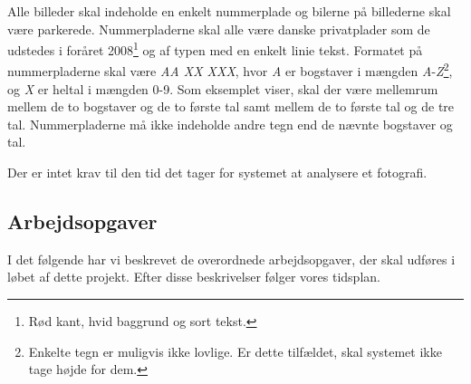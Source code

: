 \documentclass[12pt,a4paper,final]{report}
\begin{document}
Alle billeder skal indeholde en enkelt nummerplade og bilerne på billederne skal være parkerede. Nummerpladerne skal alle være danske privatplader som de udstedes i foråret 2008\footnote{Rød kant, hvid baggrund og sort tekst.} og af typen med en enkelt linie tekst. Formatet på nummerpladerne skal være \textit{AA XX XXX}, hvor \textit{A} er bogstaver i mængden \textit{A}-\textit{Z}\footnote{Enkelte tegn er muligvis ikke lovlige. Er dette tilfældet, skal systemet ikke tage højde for dem.}, og \textit{X} er heltal i mængden 0-9. Som eksemplet viser, skal der være mellemrum mellem de to bogstaver og de to første tal samt mellem de to første tal og de tre tal. Nummerpladerne må ikke indeholde andre tegn end de nævnte bogstaver og tal.


Der er intet krav til den tid det tager for systemet at analysere et fotografi.












	
\subsection*{Arbejdsopgaver}
I det følgende har vi beskrevet de overordnede arbejdsopgaver, der skal udføres i løbet af dette projekt. Efter disse beskrivelser følger vores tidsplan.
\end{document}
